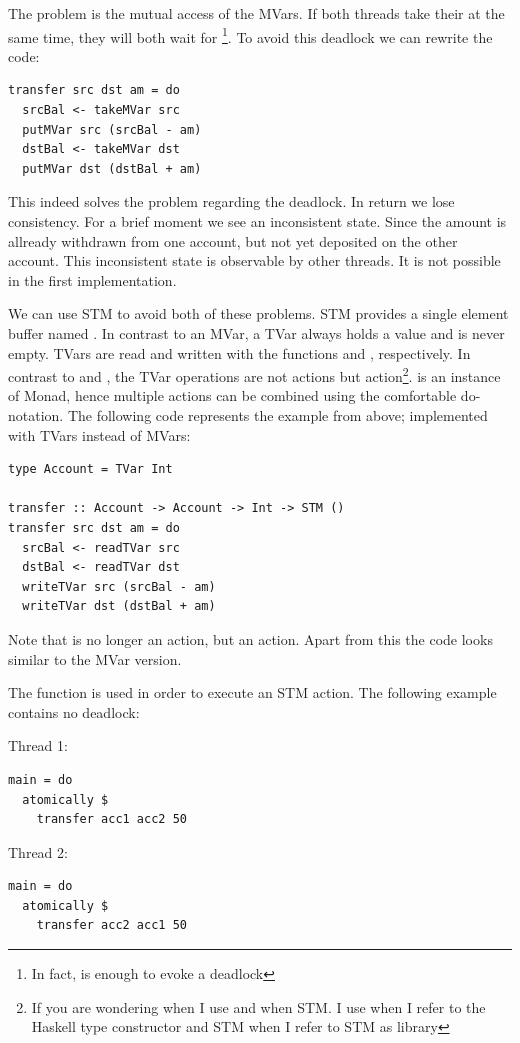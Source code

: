 The problem is the mutual access of the MVars. If both threads take their  at the same time, they will both wait for 
\footnote{In fact,  is enough to evoke a deadlock}. To avoid this deadlock we can rewrite the code:
\begin{lstlisting}
transfer src dst am = do
  srcBal <- takeMVar src
  putMVar src (srcBal - am)
  dstBal <- takeMVar dst
  putMVar dst (dstBal + am)
\end{lstlisting}
This indeed solves the problem regarding the deadlock. In return we lose consistency. For a brief moment we see an inconsistent state. Since
the amount is allready withdrawn from one account, but not yet deposited on the other account. This inconsistent state is observable by other 
threads. It is not possible in the first implementation. 

We can use STM to avoid both of these problems. STM provides a single element buffer named . In contrast to an MVar, a 
TVar always holds a value and is never empty. TVars are read and written with the functions  and , respectively. 
In contrast to  and , the TVar operations are not  actions but  action\footnote{If 
you are wondering when I use  and when STM. I use  when I refer to the Haskell type constructor and STM when I refer to STM as library}. 
 is an instance of Monad, hence multiple  actions can be combined
using the comfortable do-notation. The following code represents the example from above; implemented with TVars instead of MVars:
\begin{lstlisting}
type Account = TVar Int

transfer :: Account -> Account -> Int -> STM ()
transfer src dst am = do
  srcBal <- readTVar src
  dstBal <- readTVar dst
  writeTVar src (srcBal - am)
  writeTVar dst (dstBal + am)
\end{lstlisting}
Note that  is no longer an  action, but an  action. Apart from this the code looks
similar to the MVar version.

The function  is used in order to execute an STM action. 
The following example contains no deadlock:
\par\noindent
\begin{minipage}[t]{.45\textwidth}
Thread 1:
\begin{lstlisting}[frame=lrtb]
main = do
  atomically $
    transfer acc1 acc2 50
\end{lstlisting}
\end{minipage}
\hfill
\begin{minipage}[t]{.45\textwidth}
Thread 2:
\begin{lstlisting}[frame=lrtb]
main = do 
  atomically $ 
    transfer acc2 acc1 50
\end{lstlisting}
\end{minipage}

